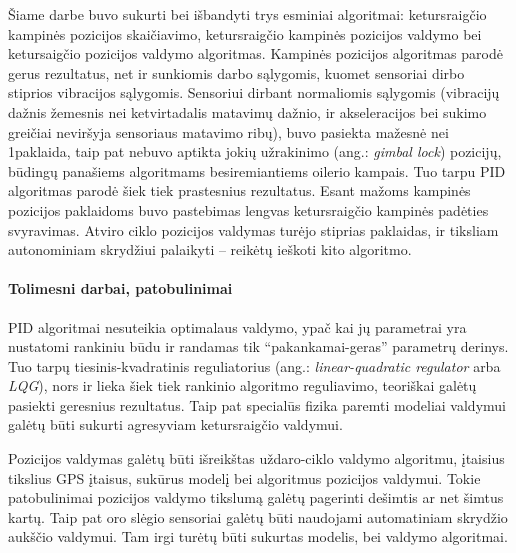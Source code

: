 \documentclass[12pt, a4paper, lithuanian, final]{article}
\begin{document}
Šiame darbe buvo sukurti bei išbandyti trys esminiai algoritmai: ketursraigčio kampinės pozicijos skaičiavimo, ketursraigčio kampinės pozicijos valdymo bei ketursaigčio pozicijos valdymo algoritmas.
Kampinės pozicijos algoritmas parodė gerus rezultatus, net ir sunkiomis darbo sąlygomis, kuomet sensoriai dirbo stiprios vibracijos sąlygomis.
Sensoriui dirbant normaliomis sąlygomis (vibracijų dažnis žemesnis nei ketvirtadalis matavimų dažnio, ir akseleracijos bei sukimo greičiai neviršyja sensoriaus matavimo ribų), buvo pasiekta mažesnė nei 1\degree paklaida, taip pat nebuvo aptikta jokių užrakinimo (ang.: \textit{gimbal lock}) pozicijų, būdingų panašiems algoritmams besiremiantiems oilerio kampais.
Tuo tarpu PID algoritmas parodė šiek tiek prastesnius rezultatus.
Esant mažoms kampinės pozicijos paklaidoms buvo pastebimas lengvas ketursraigčio kampinės padėties svyravimas.
Atviro ciklo pozicijos valdymas turėjo stiprias paklaidas, ir tiksliam autonominiam skrydžiui palaikyti -- reikėtų ieškoti kito algoritmo.


\paragraph{Tolimesni darbai, patobulinimai}

PID algoritmai nesuteikia optimalaus valdymo, ypač kai jų parametrai yra nustatomi rankiniu būdu ir randamas tik "`pakankamai-geras"' parametrų derinys.
Tuo tarpų tiesinis-kvadratinis reguliatorius (ang.: \textit{linear-quadratic regulator} arba \textit{LQG}), nors ir lieka šiek tiek rankinio algoritmo reguliavimo, teoriškai galėtų pasiekti geresnius rezultatus.
Taip pat specialūs fizika paremti modeliai valdymui galėtų būti sukurti agresyviam ketursraigčio valdymui.

Pozicijos valdymas galėtų būti išreikštas uždaro-ciklo valdymo algoritmu, įtaisius tikslius GPS įtaisus, sukūrus modelį bei algoritmus pozicijos valdymui.
Tokie patobulinimai pozicijos valdymo tikslumą galėtų pagerinti dešimtis ar net šimtus kartų.
Taip pat oro slėgio sensoriai galėtų būti naudojami automatiniam skrydžio aukščio valdymui.
Tam irgi turėtų būti sukurtas modelis, bei valdymo algoritmai.



\end{document}

